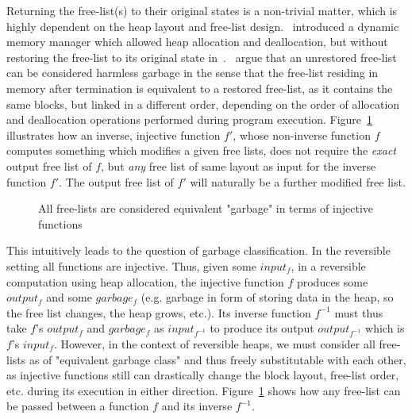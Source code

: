 Returning the free-list(s) to their original states is a non-trivial matter, which is highly dependent on the heap layout and free-list design.~\citeauthor{ha:heap} introduced a dynamic memory manager which allowed heap allocation and deallocation, but without restoring the free-list to its original state in~\cite{ha:heap}.~\citeauthor{ha:heap} argue that an unrestored free-list can be considered harmless garbage in the sense that the free-list residing in memory after termination is equivalent to a restored free-list, as it contains the same blocks, but linked in a different order, depending on the order of allocation and deallocation operations performed during program execution. Figure~\ref{fig:equivalent-free-lists} illustrates how an inverse, injective function $f'$, whose non-inverse function $f$ computes something which modifies a given free lists, does not require the \textit{exact} output free list of $f$, but \textit{any} free list of same layout as input for the inverse function $f'$. The output free list of $f'$ will naturally be a further modified free list.

\begin{figure}[ht]
  \centering
  \caption{All free-lists are considered equivalent "garbage" in terms of injective functions}
  \label{fig:equivalent-free-lists}
\end{figure}

This intuitively leads to the question of garbage classification. In the reversible setting all functions are injective. Thus, given some $input_f$, in a reversible computation using heap allocation, the injective function $f$ produces some $output_f$ and some $garbage_f$ (e.g. garbage in form of storing data in the heap, so the free list changes, the heap grows, etc.). Its inverse function $f^{-1}$ must thus take $f$'s $output_f$ and $garbage_f$ as $input_{f^{-1}}$ to produce its output $output_{f^{-1}}$ which is $f$'s $input_f$. However, in the context of reversible heaps, we must consider all free-lists as of "equivalent garbage class" and thus freely substitutable with each other, as injective functions still can drastically change the block layout, free-list order, etc. during its execution in either direction. Figure~\ref{fig:equivalent-free-lists} shows how any free-list can be passed between a function $f$ and its inverse $f^{-1}$.


